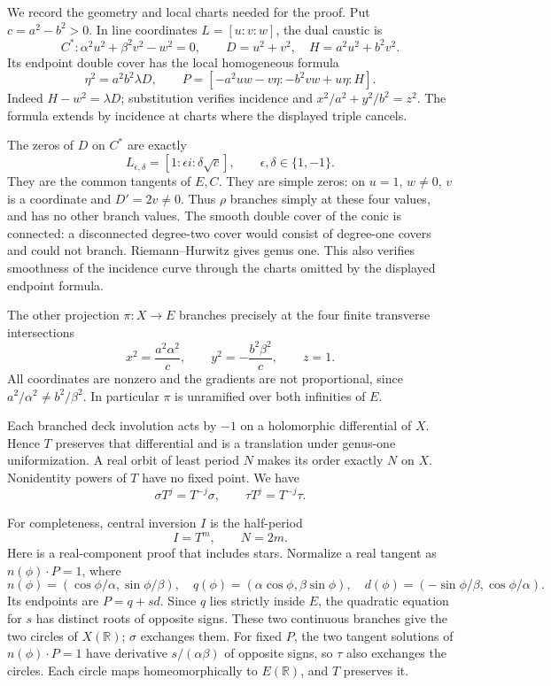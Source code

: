 \documentclass[11pt]{article}
\newcommand{\RR}{\mathbb R}
\begin{document}
We record the geometry and local charts needed for the proof.
Put \(c=a^2-b^2>0\). In line coordinates \(L=[u:v:w]\), the dual caustic is
\[
 C^*:\alpha^2u^2+\beta^2v^2-w^2=0,\qquad
 D=u^2+v^2,\quad H=a^2u^2+b^2v^2.
\]
Its endpoint double cover has the local homogeneous formula
\begin{equation}\label{cover}
 \eta^2=a^2b^2\lambda D,\qquad
 P=[-a^2uw-v\eta:-b^2vw+u\eta:H].
\end{equation}
Indeed \(H-w^2=\lambda D\); substitution verifies incidence and
\(x^2/a^2+y^2/b^2=z^2\). The formula extends by incidence at charts
where the displayed triple cancels.

The zeros of \(D\) on \(C^*\) are exactly
\begin{equation}\label{branch}
 L_{\epsilon,\delta}=[1:\epsilon i:\delta\sqrt c],
 \qquad \epsilon,\delta\in\{1,-1\}.
\end{equation}
They are the common tangents of \(E,C\). They are simple zeros:
on \(u=1\), \(w\ne0\), \(v\) is a coordinate and \(D'=2v\ne0\).
Thus \(\rho\) branches simply at these four values, and has no other
branch values. The smooth double cover of the conic is connected:
a disconnected degree-two cover would consist of degree-one covers
and could not branch. Riemann--Hurwitz gives genus one.
This also verifies smoothness of the incidence curve through the
charts omitted by the displayed endpoint formula.

The other projection \(\pi:X\to E\) branches precisely at the four
finite transverse intersections
\[
 x^2=\frac{a^2\alpha^2}{c},\qquad
 y^2=-\frac{b^2\beta^2}{c},\qquad z=1.
\]
All coordinates are nonzero and the gradients are not proportional,
since \(a^2/\alpha^2\ne b^2/\beta^2\).
In particular \(\pi\) is unramified over both infinities of \(E\).

Each branched deck involution acts by \(-1\) on a holomorphic
differential of \(X\). Hence \(T\) preserves that differential and is
a translation under genus-one uniformization. A real orbit of least
period \(N\) makes its order exactly \(N\) on \(X\).
Nonidentity powers of \(T\) have no fixed point. We have
\begin{equation}\label{reverse}
 \sigma T^j=T^{-j}\sigma,\qquad \tau T^j=T^{-j}\tau .
\end{equation}

For completeness, central inversion \(I\) is the half-period
\begin{equation}\label{central}
 I=T^m,\qquad N=2m .
\end{equation}
Here is a real-component proof that includes stars.
Normalize a real tangent as \(n(\phi)\cdot P=1\), where
\[
 n(\phi)=(\cos\phi/\alpha,\sin\phi/\beta),\quad
 q(\phi)=(\alpha\cos\phi,\beta\sin\phi),\quad
 d(\phi)=(-\sin\phi/\beta,\cos\phi/\alpha).
\]
Its endpoints are \(P=q+s d\).
Since \(q\) lies strictly inside \(E\), the quadratic equation for \(s\)
has distinct roots of opposite signs. These two continuous branches
give the two circles of \(X(\RR)\); \(\sigma\) exchanges them.
For fixed \(P\), the two tangent solutions of \(n(\phi)\cdot P=1\)
have derivative \(s/(\alpha\beta)\) of opposite signs, so \(\tau\)
also exchanges the circles. Each circle maps homeomorphically to
\(E(\RR)\), and \(T\) preserves it.
\end{document}
